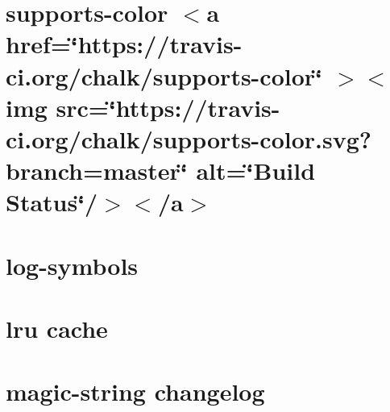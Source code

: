 \documentclass[twoside]{book}
\newcommand{\+}{\discretionary{\mbox{\scriptsize$\hookleftarrow$}}{}{}}
\begin{document}
\chapter{supports-\/color \texorpdfstring{$<$}{<}a href=\char`\"{}https\+://travis-\/ci.\+org/chalk/supports-\/color\char`\"{} \texorpdfstring{$>$}{>}\texorpdfstring{$<$}{<}img src=\char`\"{}https\+://travis-\/ci.\+org/chalk/supports-\/color.\+svg?branch=master\char`\"{} alt=\char`\"{}\+Build Status\char`\"{}/\texorpdfstring{$>$}{>}\texorpdfstring{$<$}{<}/a\texorpdfstring{$>$}{>}}
\label{md__c___users_vaishnavi_jadhav__desktop__developer_code_mean_stack_example_client_node_modules_l22bb67e69802b5e6b29c530bcea745cc}

\chapter{log-\/symbols}
\label{md__c___users_vaishnavi_jadhav__desktop__developer_code_mean_stack_example_client_node_modules_log_symbols_readme}

\chapter{lru cache}
\label{md__c___users_vaishnavi_jadhav__desktop__developer_code_mean_stack_example_client_node_modules_lru_cache__r_e_a_d_m_e}

\chapter{magic-\/string changelog}
\label{md__c___users_vaishnavi_jadhav__desktop__developer_code_mean_stack_example_client_node_modules_magic_string__c_h_a_n_g_e_l_o_g}

\end{document}
